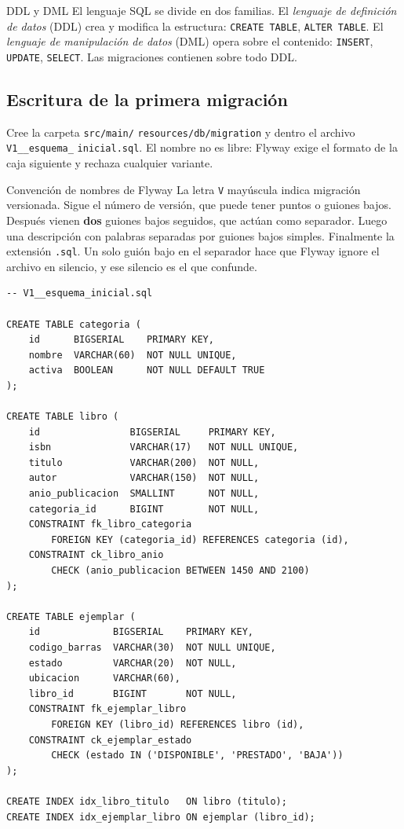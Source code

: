 \documentclass[11pt,a4paper,openany]{book}
\begin{document}
\begin{cajadefinicion}{DDL y DML}
	El lenguaje SQL se divide en dos familias. El \emph{lenguaje de definición de datos} (DDL) crea y modifica la estructura: \texttt{CREATE TABLE}, \texttt{ALTER TABLE}. El \emph{lenguaje de manipulación de datos} (DML) opera sobre el contenido: \texttt{INSERT}, \texttt{UPDATE}, \texttt{SELECT}. Las migraciones contienen sobre todo DDL.
\end{cajadefinicion}

\subsection{Escritura de la primera migración}
\label{sec:primera-migracion}

Cree la carpeta \texttt{src/main/} \texttt{resources/db/migration} y dentro el archivo \texttt{V1\_\_esquema\_} \texttt{inicial.sql}. El nombre no es libre: Flyway exige el formato de la caja siguiente y rechaza cualquier variante.

\begin{cajadefinicion}{Convención de nombres de Flyway}
	La letra \texttt{V} mayúscula indica migración versionada. Sigue el número de versión, que puede tener puntos o guiones bajos. Después vienen \textbf{dos} guiones bajos seguidos, que actúan como separador. Luego una descripción con palabras separadas por guiones bajos simples. Finalmente la extensión \texttt{.sql}. Un solo guión bajo en el separador hace que Flyway ignore el archivo en silencio, y ese silencio es el que confunde.
\end{cajadefinicion}

\begin{lstlisting}[style=sql,caption={Migracion V1 --- creacion de las tablas del nucleo del catalogo.},label={lst:v1}]
-- V1__esquema_inicial.sql

CREATE TABLE categoria (
	id      BIGSERIAL    PRIMARY KEY,
	nombre  VARCHAR(60)  NOT NULL UNIQUE,
	activa  BOOLEAN      NOT NULL DEFAULT TRUE
);

CREATE TABLE libro (
	id                BIGSERIAL     PRIMARY KEY,
	isbn              VARCHAR(17)   NOT NULL UNIQUE,
	titulo            VARCHAR(200)  NOT NULL,
	autor             VARCHAR(150)  NOT NULL,
	anio_publicacion  SMALLINT      NOT NULL,
	categoria_id      BIGINT        NOT NULL,
	CONSTRAINT fk_libro_categoria
		FOREIGN KEY (categoria_id) REFERENCES categoria (id),
	CONSTRAINT ck_libro_anio
		CHECK (anio_publicacion BETWEEN 1450 AND 2100)
);

CREATE TABLE ejemplar (
	id             BIGSERIAL    PRIMARY KEY,
	codigo_barras  VARCHAR(30)  NOT NULL UNIQUE,
	estado         VARCHAR(20)  NOT NULL,
	ubicacion      VARCHAR(60),
	libro_id       BIGINT       NOT NULL,
	CONSTRAINT fk_ejemplar_libro
		FOREIGN KEY (libro_id) REFERENCES libro (id),
	CONSTRAINT ck_ejemplar_estado
		CHECK (estado IN ('DISPONIBLE', 'PRESTADO', 'BAJA'))
);

CREATE INDEX idx_libro_titulo   ON libro (titulo);
CREATE INDEX idx_ejemplar_libro ON ejemplar (libro_id);
\end{lstlisting}
\end{document}
